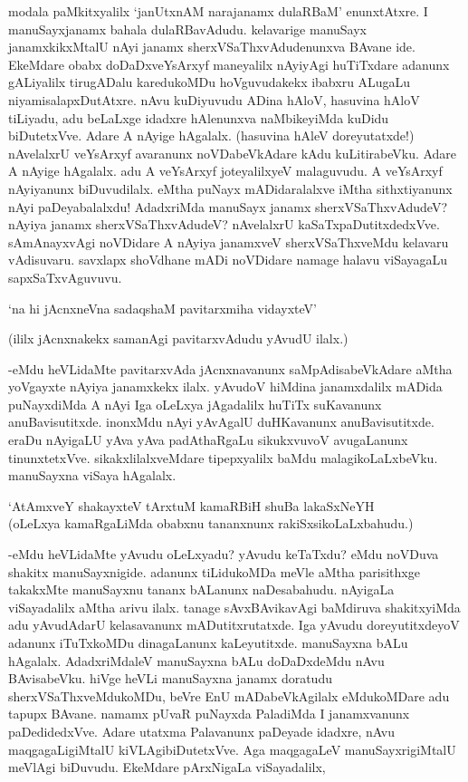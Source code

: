 modala paMkitxyalilx `janUtxnAM narajanamx dulaRBaM' enunxtAtxre. I manuSayxjanamx bahala dulaRBavAdudu. kelavarige manuSayx janamxkikxMtalU nAyi janamx sherxVSaThxvAdudenunxva BAvane ide. EkeMdare obabx doDaDxveYsArxyf maneyalilx nAyiyAgi huTiTxdare adanunx gALiyalilx tirugADalu karedukoMDu hoVguvudakekx ibabxru ALugaLu niyamisalapxDutAtxre. nAvu kuDiyuvudu ADina hAloV, hasuvina hAloV tiLiyadu, adu beLaLxge idadxre hAlenunxva naMbikeyiMda kuDidu biDutetxVve. Adare A nAyige hAgalalx. (hasuvina hAleV doreyutatxde!) nAvelalxrU veYsArxyf avaranunx noVDabeVkAdare kAdu kuLitirabeVku. Adare A nAyige hAgalalx. adu A veYsArxyf joteyalilxyeV malaguvudu. A veYsArxyf nAyiyanunx biDuvudilalx. eMtha puNayx mADidaralalxve iMtha sithxtiyanunx nAyi paDeyabalalxdu! AdadxriMda manuSayx janamx sherxVSaThxvAdudeV? nAyiya janamx sherxVSaThxvAdudeV? nAvelalxrU kaSaTxpaDutitxdedxVve. sAmAnayxvAgi noVDidare A nAyiya janamxveV sherxVSaThxveMdu kelavaru vAdisuvaru. savxlapx shoVdhane mADi noVDidare namage halavu viSayagaLu sapxSaTxvAguvuvu.

\begin{shloka}
`na hi jAcnxneVna sadaqshaM pavitarxmiha vidayxteV'
\end{shloka}

(ililx jAcnxnakekx samanAgi pavitarxvAdudu yAvudU ilalx.)

-eMdu heVLidaMte pavitarxvAda jAcnxnavanunx saMpAdisabeVkAdare aMtha yoVgayxte nAyiya janamxkekx ilalx. yAvudoV hiMdina janamxdalilx mADida puNayxdiMda A nAyi Iga oLeLxya jAgadalilx huTiTx suKavanunx anuBavisutitxde. inonxMdu nAyi yAvAgalU duHKavanunx anuBavisutitxde. eraDu nAyigaLU yAva yAva padAthaRgaLu sikukxvuvoV avugaLanunx tinunxtetxVve. sikakxlilalxveMdare tipepxyalilx baMdu malagikoLaLxbeVku. manuSayxna viSaya hAgalalx.

\begin{shloka}
`AtAmxveY shakayxteV tArxtuM kamaRBiH shuBa lakaSxNeYH\\
(oLeLxya kamaRgaLiMda obabxnu tananxnunx rakiSxsikoLaLxbahudu.)
\end{shloka}

-eMdu heVLidaMte yAvudu oLeLxyadu? yAvudu keTaTxdu? eMdu noVDuva shakitx manuSayxnigide. adanunx tiLidukoMDa meVle aMtha parisithxge takakxMte manuSayxnu tananx bALanunx naDesabahudu. nAyigaLa viSayadalilx aMtha arivu ilalx. tanage sAvxBAvikavAgi baMdiruva shakitxyiMda adu yAvudAdarU kelasavanunx mADutitxrutatxde. Iga yAvudu doreyutitxdeyoV adanunx iTuTxkoMDu dinagaLanunx kaLeyutitxde. manuSayxna bALu hAgalalx. AdadxriMdaleV manuSayxna bALu doDaDxdeMdu nAvu BAvisabeVku. hiVge heVLi manuSayxna janamx doratudu sherxVSaThxveMdukoMDu, beVre EnU mADabeVkAgilalx eMdukoMDare adu tapupx BAvane. namamx pUvaR puNayxda PaladiMda I janamxvanunx paDedidedxVve. Adare utatxma Palavanunx paDeyade idadxre, nAvu maqgagaLigiMtalU kiVLAgibiDutetxVve. Aga maqgagaLeV manuSayxrigiMtalU meVlAgi biDuvudu. EkeMdare pArxNigaLa viSayadalilx,

